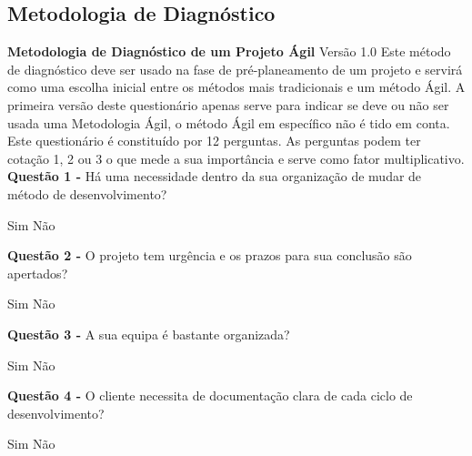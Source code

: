 \subsection{Metodologia de Diagnóstico}

\begin{framed}
\noindent\textbf{Metodologia de Diagnóstico de um Projeto Ágil}
\qquad
Versão 1.0
\vspace{2mm}
\newline Este método de diagnóstico deve ser usado na fase de pré-planeamento de um projeto e servirá como uma escolha inicial entre os métodos mais tradicionais e um método Ágil. A primeira versão deste questionário apenas serve para indicar se deve ou não ser usada uma Metodologia Ágil, o método Ágil em específico não é tido em conta.
\vspace{1mm}
\newline Este questionário é constituído por 12 perguntas. As perguntas podem ter cotação 1, 2 ou 3 o que mede a sua importância e serve como fator multiplicativo.
\vspace{5mm}
\newline\textbf{Questão 1 - } Há uma necessidade dentro da sua organização de mudar de método de desenvolvimento?
\newline \begin{center} Sim \hspace{30mm} Não \end{center}
\vspace{2mm}
\newline\textbf{Questão 2 - } O projeto tem urgência e os prazos para sua conclusão são apertados?
\newline \begin{center} Sim \hspace{30mm} Não\end{center}
\vspace{2mm}
\newline\textbf{Questão 3 - } A sua equipa é bastante organizada?
\newline \begin{center} Sim \hspace{30mm} Não \end{center}
\vspace{2mm}
\newline\textbf{Questão 4 - } O cliente necessita de documentação clara de cada ciclo de desenvolvimento?
\newline \begin{center} Sim \hspace{30mm} Não \end{center}

\end{framed}
